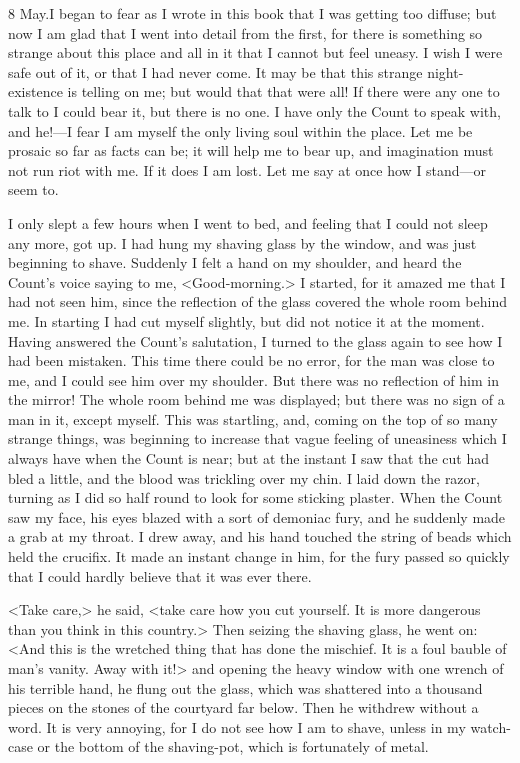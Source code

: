 \begin{diary}{8 May.}I began to fear as I wrote in this book that I was getting too diffuse; but now I am glad that I went into detail from the first, for there is something so strange about this place and all in it that I cannot but feel uneasy. I wish I were safe out of it, or that I had never come. It may be that this strange night-existence is telling on me; but would that that were all! If there were any one to talk to I could bear it, but there is no one. I have only the Count to speak with, and he!—I fear I am myself the only living soul within the place. Let me be prosaic so far as facts can be; it will help me to bear up, and imagination must not run riot with me. If it does I am lost. Let me say at once how I stand—or seem to.

I only slept a few hours when I went to bed, and feeling that I could not sleep any more, got up. I had hung my shaving glass by the window, and was just beginning to shave. Suddenly I felt a hand on my shoulder, and heard the Count's voice saying to me, <Good-morning.> I started, for it amazed me that I had not seen him, since the reflection of the glass covered the whole room behind me. In starting I had cut myself slightly, but did not notice it at the moment. Having answered the Count's salutation, I turned to the glass again to see how I had been mistaken. This time there could be no error, for the man was close to me, and I could see him over my shoulder. But there was no reflection of him in the mirror! The whole room behind me was displayed; but there was no sign of a man in it, except myself. This was startling, and, coming on the top of so many strange things, was beginning to increase that vague feeling of uneasiness which I always have when the Count is near; but at the instant I saw that the cut had bled a little, and the blood was trickling over my chin. I laid down the razor, turning as I did so half round to look for some sticking plaster. When the Count saw my face, his eyes blazed with a sort of demoniac fury, and he suddenly made a grab at my throat. I drew away, and his hand touched the string of beads which held the crucifix. It made an instant change in him, for the fury passed so quickly that I could hardly believe that it was ever there.

<Take care,> he said, <take care how you cut yourself. It is more dangerous than you think in this country.> Then seizing the shaving glass, he went on: <And this is the wretched thing that has done the mischief. It is a foul bauble of man's vanity. Away with it!> and opening the heavy window with one wrench of his terrible hand, he flung out the glass, which was shattered into a thousand pieces on the stones of the courtyard far below. Then he withdrew without a word. It is very annoying, for I do not see how I am to shave, unless in my watch-case or the bottom of the shaving-pot, which is fortunately of metal.


\end{diary}
